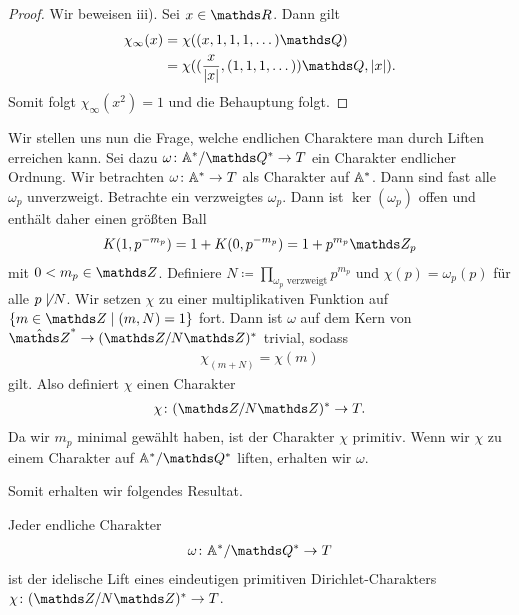 \begin{proof}
Wir beweisen iii). Sei $x\in \R$. Dann gilt
\begin{align*}
\chi_\infty(x)&=\chi((x,1,1,1,\dots)\Q)\\
&=\chi((\frac{x}{\abs{x}},(1,1,1,\dots))\Q,\abs{x}).
\end{align*}
Somit folgt $\chi_\infty(x^2)=1$ und die Behauptung folgt.
\end{proof}

Wir stellen uns nun die Frage, welche endlichen Charaktere man durch Liften erreichen kann.
Sei dazu $\omega \colon \A^\ast/\Q^\ast \to T$ ein Charakter endlicher Ordnung.
Wir betrachten $\omega \colon \mathbb{A}^\ast \to T$ als Charakter auf $\mathbb{A}^\ast$.
Dann sind fast alle $\omega_p$  unverzweigt.
Betrachte ein verzweigtes $\omega_p$. Dann ist $\ker(\omega_p)$ offen und enthält daher einen größten Ball
\begin{align*}
K(1,p^{-m_p})=1+K(0,p^{-m_p})=1+p^{m_p}\Z_p
\end{align*}
mit $0<m_p \in \Z$.
Definiere $N\coloneqq \prod_{\omega_p \text{ verzweigt}} p^{m_p}$ und $\chi(p)=\omega_p(p)$ für alle $p \not \mid N$.
Wir setzen $\chi$ zu einer multiplikativen Funktion auf $\{m \in \Z \mid (m,N)=1\}$ fort.
Dann ist $\omega$ auf dem Kern von $\hat{\Z}^\ast \to (\Z/N\Z)^\ast$ trivial, sodass
\begin{align*}
\chi_(m+N)=\chi(m)
\end{align*}
gilt.
Also definiert $\chi$ einen Charakter
\begin{align*}
\chi \colon (\Z/N\Z)^\ast \to T.
\end{align*}
Da wir $m_p$ minimal gewählt haben, ist der Charakter $\chi$ primitiv.
Wenn wir $\chi$ zu einem Charakter auf $\A^\ast/\Q^\ast$ liften, erhalten wir $\omega$.

Somit erhalten wir folgendes Resultat.
\begin{thm}
Jeder endliche Charakter
\begin{align*}
\omega \colon \A^\ast/\Q^\ast \to T
\end{align*}
ist der idelische Lift eines eindeutigen primitiven Dirichlet-Charakters $\chi \colon (\Z/N\Z)^\ast \to T$.
\end{thm}